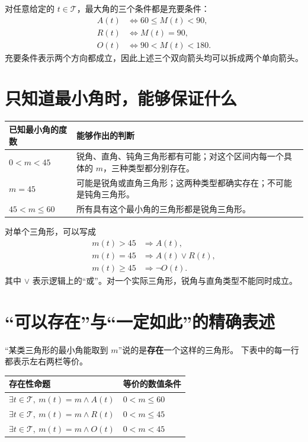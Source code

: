 \documentclass[UTF8,a4paper,zihao=-4,oneside,openany,fontset=fandol]{ctexbook}
\theoremstyle{definition}
\theoremstyle{remark}
\begin{document}
对任意给定的 $t\in\mathcal T$，最大角的三个条件都是充要条件：
\[
\boxed{
\begin{aligned}
A(t)&\Longleftrightarrow60\le M(t)<90,\\
R(t)&\Longleftrightarrow M(t)=90,\\
O(t)&\Longleftrightarrow90<M(t)<180.
\end{aligned}}
\]
充要条件表示两个方向都成立，因此上述三个双向箭头均可以拆成两个单向箭头。

\section{只知道最小角时，能够保证什么}

\begin{center}
\begin{tabular}{|p{}|p{}|}
\hline
已知最小角的度数 & 能够作出的判断\\
\hline
$0<m<45$ & 锐角、直角、钝角三角形都有可能；对这个区间内每一个具体的 $m$，三种类型都分别存在。\\
\hline
$m=45$ & 可能是锐角或直角三角形；这两种类型都确实存在；不可能是钝角三角形。\\
\hline
$45<m\le60$ & 所有具有这个最小角的三角形都是锐角三角形。\\
\hline
\end{tabular}
\end{center}

对单个三角形，可以写成
\[
\boxed{
\begin{aligned}
m(t)>45&\Longrightarrow A(t),\\
m(t)=45&\Longrightarrow A(t)\lor R(t),\\
m(t)\ge45&\Longrightarrow\neg O(t).
\end{aligned}}
\]
其中 $\lor$ 表示逻辑上的“或”。对一个实际三角形，锐角与直角类型不能同时成立。

\section{“可以存在”与“一定如此”的精确表述}

“某类三角形的最小角能取到 $m$”说的是\textbf{存在}一个这样的三角形。
下表中的每一行都表示左右两栏等价。

\begin{center}
\begin{tabular}{|p{}|p{}|}
\hline
存在性命题 & 等价的数值条件\\
\hline
$\exists t\in\mathcal T,\ m(t)=m\land A(t)$ & $0<m\le60$\\
\hline
$\exists t\in\mathcal T,\ m(t)=m\land R(t)$ & $0<m\le45$\\
\hline
$\exists t\in\mathcal T,\ m(t)=m\land O(t)$ & $0<m<45$\\
\hline
\end{tabular}
\end{center}
\end{document}
